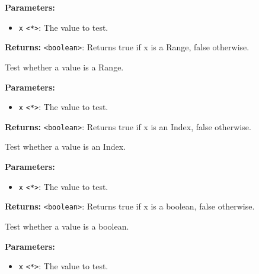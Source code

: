 \documentclass[12pt,a4paper]{article}
\begin{document}
\noindent \textbf{Parameters:}
\begin{itemize}
  \item \texttt{x} \texttt{<*>}: The value to test.
\end{itemize}

\noindent \textbf{Returns:} \texttt{<boolean>}: Returns true if \textasciigrave{}x\textasciigrave{} is a Range, false otherwise.

\noindent Test whether a value is a Range.

\vspace{5mm}
\noindent {}


\noindent \textbf{Parameters:}
\begin{itemize}
  \item \texttt{x} \texttt{<*>}: The value to test.
\end{itemize}

\noindent \textbf{Returns:} \texttt{<boolean>}: Returns true if \textasciigrave{}x\textasciigrave{} is an Index, false otherwise.

\noindent Test whether a value is an Index.

\vspace{5mm}
\noindent {}


\noindent \textbf{Parameters:}
\begin{itemize}
  \item \texttt{x} \texttt{<*>}: The value to test.
\end{itemize}

\noindent \textbf{Returns:} \texttt{<boolean>}: Returns true if \textasciigrave{}x\textasciigrave{} is a boolean, false otherwise.

\noindent Test whether a value is a boolean.

\vspace{5mm}
\noindent {}


\noindent \textbf{Parameters:}
\begin{itemize}
  \item \texttt{x} \texttt{<*>}: The value to test.
\end{itemize}
\end{document}
